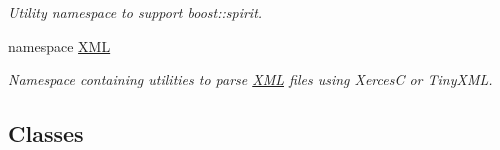 \begin{DoxyCompactItemize}
\begin{DoxyCompactList}\small\item\em Utility namespace to support boost::spirit. \item\end{DoxyCompactList}\item 
namespace \hyperlink{namespace_d_d4hep_1_1_x_m_l}{XML}


\begin{DoxyCompactList}\small\item\em Namespace containing utilities to parse \hyperlink{namespace_d_d4hep_1_1_x_m_l}{XML} files using XercesC or TinyXML. \item\end{DoxyCompactList}\end{DoxyCompactItemize}
\subsection*{Classes}

